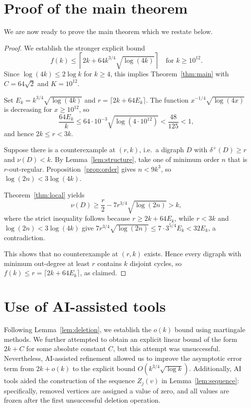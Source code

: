 \documentclass[10pt,a4paper]{article}
\numberwithin{equation}{section}
\begin{document}


\section{Proof of the main theorem}\label{sec:mainproof}

We are now ready to prove the main theorem which we restate below.

\MainThm*

\begin{proof}
We establish the stronger explicit bound
$$
f(k)\le\left\lceil2k+64k^{3/4}\sqrt{\log(4k)}\right\rceil
\quad\text{for }k\ge10^{12}.
$$
Since $\log(4k)\le2\log k$ for $k\ge4$, this implies
Theorem~\ref{thm:main} with $C=64\sqrt2$ and $K=10^{12}$.

Set $E_k=k^{3/4}\sqrt{\log(4k)}$ and $r=\lceil2k+64E_k\rceil$.
The function $x^{-1/4}\sqrt{\log(4x)}$ is decreasing for $x\ge10^{12}$, so
$$
\frac{64E_k}{k}\le64\cdot10^{-3}\sqrt{\log(4\cdot10^{12})}<\frac{48}{125}<1,
$$
and hence $2k\le r<3k$.

Suppose there is a counterexample at $(r,k)$,
i.e.\ a digraph $D$ with $\delta^+(D)\ge r$ and $\nu(D)<k$. By
Lemma~\ref{lem:structure}, take one of minimum order $n$ that is
$r$-out-regular. Proposition~\ref{prop:order} gives $n<9k^3$, so
$\log(2n)<3\log(4k)$.

Theorem~\ref{thm:local} yields
$$
\nu(D)\ge\frac r2-7r^{3/4}\sqrt{\log(2n)}>k,
$$
where the strict inequality follows because $r\ge2k+64E_k$, while
$r<3k$ and $\log(2n)<3\log(4k)$ give
$7r^{3/4}\sqrt{\log(2n)}\le7\cdot3^{5/4}E_k<32E_k$, a contradiction.

This shows that no counterexample at $(r,k)$ exists. Hence every
digraph with minimum out-degree at least $r$ contains $k$ disjoint
cycles, so $f(k)\le r=\lceil2k+64E_k\rceil$, as claimed.
\end{proof}




\section*{Use of AI-assisted tools} 

Following Lemma~\ref{lem:deletion}, we establish the $o(k)$ bound using martingale methods. We further attempted to obtain an explicit linear bound of the form $2k+C$ for some absolute constant $C$, but this attempt was unsuccessful. Nevertheless, AI-assisted refinement allowed us to improve the asymptotic error term from $2k+o(k)$ to the explicit bound $O(k^{3/4}\sqrt{\log k})$. Additionally, AI tools aided the construction of the sequence $Z_j(v)$ in Lemma~\ref{lem:sequence}: specifically, removed vertices are assigned a value of zero, and all values are frozen after the first unsuccessful deletion operation.
\end{document}
